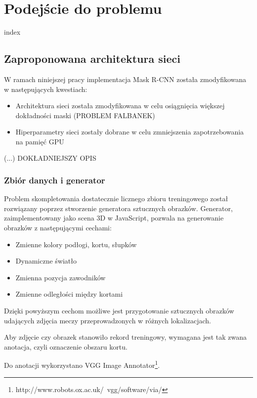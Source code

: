\chapter{Podejście do problemu}

{index}

\section{Zaproponowana architektura sieci}
\label{sec:zaproponowana_architektura}

W ramach niniejszej pracy implementacja Mask R-CNN została zmodyfikowana w następujących kwestiach:

\begin{itemize}
	\item Architektura sieci została zmodyfikowana w celu osiągnięcia większej dokładności maski (PROBLEM FALBANEK)
	\item Hiperparametry sieci zostały dobrane w celu zmniejszenia zapotrzebowania na pamięć GPU
\end{itemize}

(...) DOKŁADNIEJSZY OPIS

\subsection{Zbiór danych i generator}
\label{sec:generator}

Problem skompletowania dostatecznie licznego zbioru treningowego został rozwiązany poprzez stworzenie generatora sztucznych obrazków. Generator, zaimplementowany jako scena 3D w JavaScript, pozwala na generowanie obrazków z następującymi cechami:

\begin{itemize}
	\item Zmienne kolory podłogi, kortu, słupków
	\item Dynamiczne światło
	\item Zmienna pozycja zawodników
	\item Zmienne odległości między kortami
\end{itemize}

Dzięki powyższym cechom możliwe jest przygotowanie sztucznych obrazków udających zdjęcia meczy przeprowadzonych w różnych lokalizacjach.

Aby zdjęcie czy obrazek stanowiło rekord treningowy, wymagana jest tak zwana anotacja, czyli oznaczenie obszaru kortu.

Do anotacji wykorzystano VGG Image Annotator\footnote{http://www.robots.ox.ac.uk/~vgg/software/via/}.

